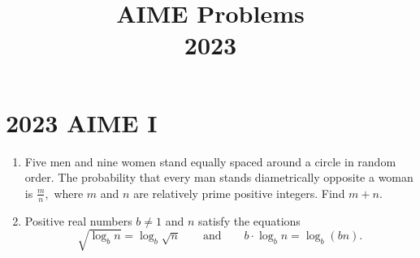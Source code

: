 \documentclass{article}
\title{AIME Problems \\ 2023}
\date{}
\begin{document}
\maketitle\thispagestyle{fancy}\newpage\section*{2023 AIME I}\begin{enumerate}[label=\arabic*., itemsep=0.5em]\item Five men and nine women stand equally spaced around a circle in random order. The probability that every man stands diametrically opposite a woman is \(\frac{m}{n},\) where \(m\) and \(n\) are relatively prime positive integers. Find \(m+n.\)\par \vspace{0.5em}\item Positive real numbers \(b \not= 1\) and \(n\) satisfy the equations 
\begin{equation*}
\sqrt{\log_b n} = \log_b \sqrt{n} \qquad \text{and} \qquad b \cdot \log_b n = \log_b (bn).
\end{equation*}

\end{enumerate}
\end{document}
